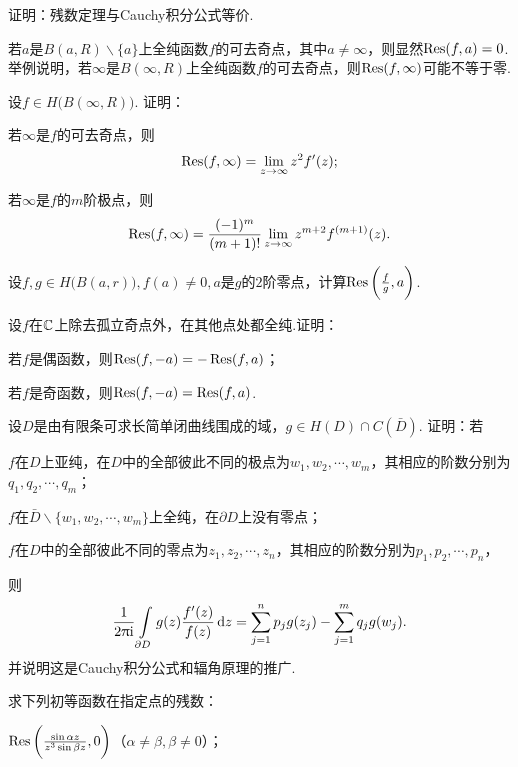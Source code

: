 \begin{xiti}
  \item 证明：残数定理与Cauchy积分公式等价.
  \item 若$a$是$B(a,R)\backslash\{a\}$上全纯函数$f$的可去奇点，其中$a\ne\infty$，则显然$\operatorname*{Res}(f,a)=0$.举例说明，若$\infty$是$B(\infty,R)$上全纯函数$f$的可去奇点，则$\operatorname*{Res}(f,\infty)$可能不等于零.
  \item 设$f\in H\big(B(\infty,R)\big)$. 证明：
    \begin{enuma}
      \item 若$\infty$是$f$的可去奇点，则
        \[
          \operatorname*{Res}(f,\infty) = \lim_{z\to\infty}z^2f'(z);
        \]
      \item 若$\infty$是$f$的$m$阶极点，则
        \[
          \operatorname*{Res}(f,\infty) = \frac{(-1)^m}{(m+1)!}\lim_{z\to\infty}z^{m+2}f^{(m+1)}(z).
        \]
    \end{enuma}
  \item 设$f,g\in H\big(B(a,r)\big),f(a)\ne0,a$是$g$的$2$阶零点，计算$\operatorname*{Res}\bigg(\frac fg,a\bigg)$.
  \item 设$f$在$\mathbb C$上除去孤立奇点外，在其他点处都全纯.证明：
    \begin{enuma}
      \item 若$f$是偶函数，则$\operatorname*{Res}(f,-a)=-\operatorname*{Res}(f,a)$；
      \item 若$f$是奇函数，则$\operatorname*{Res}(f,-a)=\operatorname*{Res}(f,a)$.
    \end{enuma}
  \item 设$D$是由有限条可求长简单闭曲线围成的域，$g\in H(D)\cap C(\bar D)$. 证明：若
    \begin{enuma}
      \item $f$在$D$上亚纯，在$D$中的全部彼此不同的极点为$w_1,w_2,\cdots,w_m$，其相应的阶数分别为
        $q_1,q_2,\cdots,q_m$；
      \item $f$在$\bar D\backslash\{w_1,w_2,\cdots,w_m\}$上全纯，在$\partial D$上没有零点；
      \item $f$在$D$中的全部彼此不同的零点为$z_1,z_2,\cdots,z_n$，其相应的阶数分别为$p_1,p_2,\cdots,p_n$，
    \end{enuma}
    则
    \[
      \frac1{2\uppi\mathrm i}\int\limits_{\partial D}g(z)\frac{f'(z)}{f(z)}\mathop{}\!\mathrm dz = \sum_{j=1}^n
      p_jg(z_j)-\sum_{j=1}^m q_jg(w_j).
    \]
    并说明这是Cauchy积分公式和辐角原理的推广.
  \item 求下列初等函数在指定点的残数：
    \begin{enuma}
      \item $\operatorname*{Res}\bigg(\frac{\sin\alpha z}{z^3\sin\beta z},0\bigg)$（$\alpha\ne\beta,\beta\ne0$）；

\end{enuma}
\end{xiti}
